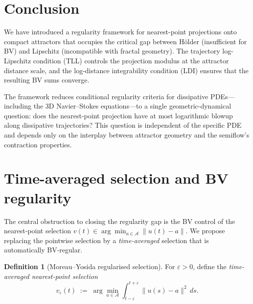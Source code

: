 \documentclass[12pt,a4paper]{article}
\theoremstyle{definition}
\newtheorem{definition}{Definition}[section]
\theoremstyle{plain}
\theoremstyle{remark}
\begin{document}
\section{Conclusion}

We have introduced a regularity framework for nearest-point
projections onto compact attractors that occupies the critical
gap between H\"older (insufficient for BV) and Lipschitz
(incompatible with fractal geometry).  The trajectory log-Lipschitz
condition (TLL) controls the projection modulus at the attractor
distance scale, and the log-distance integrability condition (LDI)
ensures that the resulting BV sums converge.

The framework reduces conditional regularity criteria for
dissipative PDEs---including the 3D Navier--Stokes
equations---to a single geometric-dynamical question: does the
nearest-point projection have at most logarithmic blowup along
dissipative trajectories?  This question is independent of the
specific PDE and depends only on the interplay between attractor
geometry and the semiflow's contraction properties.


\section{Time-averaged selection and BV regularity}
\label{sec:time-averaged}

The central obstruction to closing the regularity gap is the BV
control of the nearest-point selection
$v(t) \in \arg\min_{a \in \mathcal{A}} \|u(t) - a\|$.  We propose
replacing the pointwise selection by a \emph{time-averaged} selection
that is automatically BV-regular.

\begin{definition}[Moreau--Yosida regularised selection]
\label{def:my-selection}
For $\varepsilon > 0$, define the \emph{time-averaged nearest-point
selection}
\[
  v_\varepsilon(t)
  \;:=\;
  \arg\min_{a \in \mathcal{A}}
  \int_{t-\varepsilon}^{t+\varepsilon}
  \|u(s) - a\|^2 \, ds.
\]
\end{definition}
\end{document}
